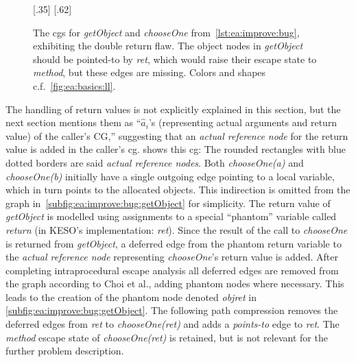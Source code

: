 			\begin{figure}
				\centering%
				{%
						\centering%
				}%
				\hspace{\fill}%
				{%
						\centering%
				}%
				\caption[The \glspl{cg} for \emph{getObject} and \emph{chooseOne} exhibiting the double return flaw]{%
					The \glspl{cg} for \emph{getObject} and \emph{chooseOne} from~\cref{lst:ea:improve:bug}, exhibiting the
					double return flaw. The object nodes in \emph{getObject} should be pointed-to by \emph{ret}, which would
					raise their escape state to \emph{method}, but these edges are missing. Colors and shapes
					c.f.~\cref{fig:ea:basics:ll}.}%
				\label{fig:ea:improve:bug}%
			\end{figure}

			The handling of return values is not explicitly explained in this section, but the next section mentions them as
			\enquote{$\hat{a}_i$'s (representing actual arguments and return value) of the caller's CG,}
			\cite[p.~891]{choi:03:toplas} suggesting that an \emph{actual reference node} for the return value is added in the
			caller's \gls{cg}.  shows this \acrlong{cg}: The rounded rectangles with
			blue dotted borders are said \emph{actual reference nodes}. Both \emph{chooseOne(a)} and \emph{chooseOne(b)}
			initially have a single outgoing edge pointing to a local variable, which in turn points to the allocated objects.
			This indirection is omitted from the graph in~\cref{subfig:ea:improve:bug:getObject} for simplicity. The return
			value of \emph{getObject} is modelled using assignments to a special \enquote{phantom} variable called
			\emph{return} (in KESO's implementation: \emph{ret}). Since the result of the call to \emph{chooseOne} is returned
			from \emph{getObject}, a deferred edge from the phantom return variable to the \emph{actual reference node}
			representing \emph{chooseOne}'s return value is added. After completing intraprocedural escape analysis all
			deferred edges are removed from the graph according to Choi et al., adding phantom nodes where necessary. This
			leads to the creation of the phantom node denoted \emph{objret} in \cref{subfig:ea:improve:bug:getObject}. The
			following path compression removes the deferred edges from \emph{ret} to \emph{chooseOne(ret)} and adds
			a \emph{points-to} edge to \emph{ret}. The \emph{method} escape state of \emph{chooseOne(ret)} is retained, but is
			not relevant for the further problem description.

